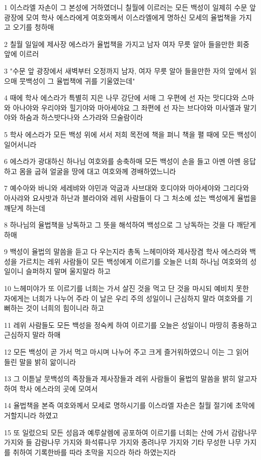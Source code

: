 \par 1 이스라엘 자손이 그 본성에 거하였더니 칠월에 이르러는 모든 백성이 일제히 수문 앞 광장에 모여 학사 에스라에게 여호와께서 이스라엘에게 명하신 모세의 율법책을 가지고 오기를 청하매
\par 2 칠월 일일에 제사장 에스라가 율법책을 가지고 남자 여자 무릇 알아 들을만한 회중 앞에 이르러
\par 3 "수문 앞 광장에서 새벽부터 오정까지 남자, 여자 무릇 알아 들을만한 자의 앞에서 읽으매 뭇백성이 그 율법책에 귀를 기울였는데"
\par 4 때에 학사 에스라가 특별히 지은 나무 강단에 서매 그 우편에 선 자는 맛디댜와 스마와 아나야와 우리야와 힐기야와 마아세야요 그 좌편에 선 자는 브다야와 미사엘과 말기야와 하숨과 하스밧다나와 스가랴와 므술람이라
\par 5 학사 에스라가 모든 백성 위에 서서 저희 목전에 책을 펴니 책을 펼 때에 모든 백성이 일어서니라
\par 6 에스라가 광대하신 하나님 여호와를 송축하매 모든 백성이 손을 들고 아멘 아멘 응답하고 몸을 굽혀 얼굴을 땅에 대고 여호와께 경배하였느니라
\par 7 예수아와 바니와 세레뱌와 야민과 악굽과 사브대와 호디야와 마아세야와 그리다와 아사랴와 요사밧과 하난과 블라야와 레위 사람들이 다 그 처소에 섰는 백성에게 율법을 깨닫게 하는데
\par 8 하나님의 율법책을 낭독하고 그 뜻을 해석하여 백성으로 그 낭독하는 것을 다 깨닫게 하매
\par 9 백성이 율법의 말씀을 듣고 다 우는지라 총독 느헤미야와 제사장겸 학사 에스라와 백성을 가르치는 레위 사람들이 모든 백성에게 이르기를 오늘은 너희 하나님 여호와의 성일이니 슬퍼하지 말며 울지말라 하고
\par 10 느헤미야가 또 이르기를 너희는 가서 살진 것을 먹고 단 것을 마시되 예비치 못한 자에게는 너희가 나누어 주라 이 날은 우리 주의 성일이니 근심하지 말라 여호와를 기뻐하는 것이 너희의 힘이니라 하고
\par 11 레위 사람들도 모든 백성을 정숙케 하여 이르기를 오늘은 성일이니 마땅히 종용하고 근심하지 말라 하매
\par 12 모든 백성이 곧 가서 먹고 마시며 나누어 주고 크게 즐거워하였으니 이는 그 읽어 들린 말을 밝히 앎이니라
\par 13 그 이튿날 뭇백성의 족장들과 제사장들과 레위 사람들이 율법의 말씀을 밝히 알고자 하여 학사 에스라의 곳에 모여서
\par 14 율법책을 본즉 여호와께서 모세로 명하시기를 이스라엘 자손은 칠월 절기에 초막에 거할지니라 하였고
\par 15 또 일렀으되 모든 성읍과 예루살렘에 공포하여 이르기를 너희는 산에 가서 감람나무 가지와 들 감람나무 가지와 화석류나무 가지와 종려나무 가지와 기타 무성한 나무 가지를 취하여 기록한바를 따라 초막을 지으라 하라 하였는지라
